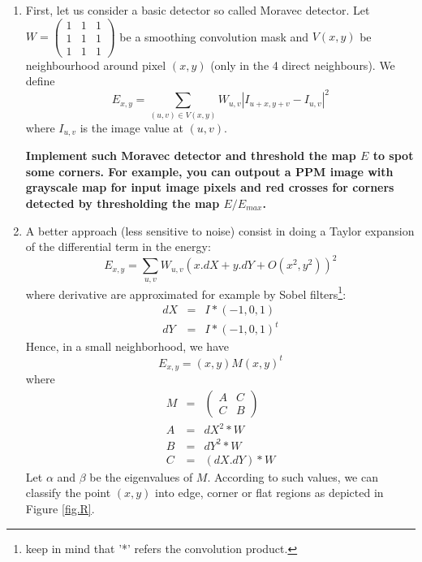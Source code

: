 \documentclass[a4paper, 11pt, french]{article}
\begin{document}
\begin{enumerate}
 	\item First, let us consider a basic detector so called Moravec detector. Let  $W=\left(\begin{array}{ccc} 1 & 1 & 1\\1 & 1 & 1\\1 & 1 & 1\end{array}\right)$ be a smoothing convolution mask and $V(x,y)$ be neighbourhood around pixel $(x,y)$ (only in the 4 direct neighbours). We define 
	\begin{equation}
	\label{eq1}
	E_{x,y}=\sum_{(u,v)\in V(x,y)} W_{u,v}\left|I_{u+x,y+v}-I_{u,v}\right|^2
	\end{equation}
	where $I_{u,v}$ is the image value at $(u,v)$.
 
	{\bf Implement such Moravec detector and threshold the map $E$ to spot some corners. For example, you can outpout a PPM image with grayscale map  for input image pixels and red crosses for corners detected by thresholding the map $E/E_{max}$.}

	\item A better approach (less sensitive to noise) consist in doing a Taylor expansion of the differential term in the energy:
	\begin{equation}
		E_{x,y}=\sum_{u,v} W_{u,v}\left(x.dX+y.dY+O(x^2,y^2)\right)^2
	\end{equation}
	where derivative are approximated for example by Sobel filters\footnote{keep in mind that '*' refers the convolution product.}:
	\begin{eqnarray}
		dX & = & I * (-1,0,1) \\
		dY & = & I * (-1,0,1)^t
	\end{eqnarray}  
	Hence, in a  small neighborhood, we have 
	$$E_{x,y}=(x,y) M (x,y)^t$$ where
	\begin{eqnarray}
		M & = &\left(\begin{array}{cc} A & C\\ C & B\end{array}\right)\\
		A & = & dX^2 *  W \\
		B & = & dY^2 * W \\
		C & = & (dX.dY)*  W 
	\end{eqnarray}
	Let $\alpha$ and $\beta$ be the eigenvalues of $M$. According to such values, we can classify the point $(x,y)$ into edge, corner or flat regions as depicted in Figure \ref{fig.R}.


\end{enumerate}
\end{document}

